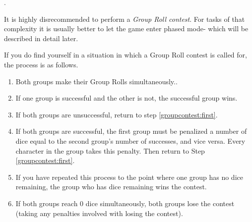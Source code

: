 \begin{GRPquicknote}
\GRPrfooter{}
\GRPrfooter{}
\GRPrfooter{}
.
\end{GRPquicknote}

It is highly disrecommended to perform a \emph{Group Roll contest}. For tasks of that complexity it is usually better to let the game enter phased mode- which will be described in detail later.

If you do find yourself in a situation in which a Group Roll contest is called for, the process is as follows.

\begin{enumerate}
	\item\label{groupcontest:first} Both groups make their Group Rolls simultaneously..
	\item If one group is successful and the other is not, the successful group wins.
	\item If both groups are unsuccessful, return to step \ref{groupcontest:first}.
	\item If both groups are successful, the first group must be penalized a number of dice equal to the second group's number of successes, and vice versa. Every character in the group takes this penalty. Then return to Step \ref{groupcontest:first}.
	\item If you have repeated this process to the point where one group has no dice remaining, the group who has dice remaining wins the contest.
	\item\label{groupcontest:last} If both groups reach 0 dice simultaneously, both groups lose the contest (taking any penalties involved with losing the contest).
\end{enumerate}

